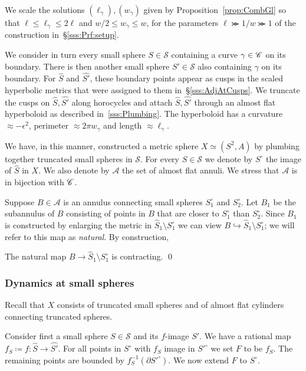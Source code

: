 \documentclass{amsart}
\newcommand\Sph{{\mathscr S}}
\newcommand\Ann{{\mathscr A}}
\begin{document}
We scale the solutions $(\ell_\gamma),(w_\gamma)$ given by
Proposition~\ref{prop:CombGl} so that $\ell \le \ell_\gamma \le 2\ell$
and $w/2\le w_\gamma\le w$, for the parameters
$\ell\ggcurly 1/w\ggcurly 1$ of the construction in~\S\ref{sss:Prf:setup}.

We consider in turn every small sphere $S\in\Sph$ containing a curve
$\gamma\in{\mathscr C}$ on its boundary. There is then another small sphere
$S'\in\Sph$ also containing $\gamma$ on its boundary. For $\widehat S$
and $\widehat{S'}$, these boundary points appear as cusps in the
scaled hyperbolic metrics that were assigned to them
in~\S\ref{sss:AdjAtCusps}. We truncate the cusps on
$\widehat S,\widehat {S'}$ along horocycles and attach
$\widehat S,\widehat {S'}$ through an almost flat hyperboloid as
described in~\ref{sss:Plumbing}. The hyperboloid has a curvature
$\approx-\epsilon^2$, perimeter $\approx2\pi w_\gamma$ and length
$\approx\ell_\gamma$.

We have, in this manner, constructed a metric sphere $X\simeq (S^2,A)$
by plumbing together truncated small spheres in $\Sph$.  For every
$S\in \Sph$ we denote by $S^\circ$ the image of $\widehat S$ in
$X$. We also denote by $\Ann$ the set of almost flat annuli. We stress
that $\Ann$ is in bijection with ${\mathscr C}$.

Suppose $B\in \Ann$ is an annulus connecting small spheres $S^\circ_1$
and $S^\circ_2$. Let $B_1$ be the subannulus of $B$ consisting of
points in $B$ that are closer to $S_1^\circ$ than $S_2^\circ$. Since
$B_1$ is constructed by enlarging the metric in
$\widehat S_1\setminus S^\circ_1$ we can view
$B\hookrightarrow \widehat S_1\setminus S^\circ_1$; we will refer to
this map as \emph{natural}. By construction,
\begin{lem}\label{lem:ExpNatMap}
  The natural map $B\to \widehat S_1\setminus S^\circ_1$ is
  contracting.  \qed
\end{lem}

\subsubsection{Dynamics at small spheres}
Recall that $X$ consists of truncated small spheres and of almost flat
cylinders connecting truncated spheres.

Consider first a small sphere $S\in \Sph$ and its $f$-image $S'$. We
have a rational map $f_S\coloneqq f\colon\widehat S\to
\widehat{S'}$. For all points in $S^{\circ}$ with $f_S$ image in
$S'^{\circ}$ we set $F$ to be $f_S$. The remaining points are bounded
by $f_S^{-1}(\partial S'^\circ)$. We now extend $F$ to $S^\circ$.
\end{document}
